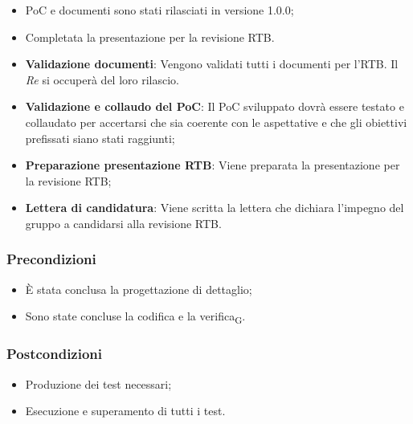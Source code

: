 \:
\begin{itemize}
	\item PoC e documenti sono stati rilasciati in versione 1.0.0;
	\item Completata la presentazione per la revisione RTB.
\end{itemize}

\:
\begin{itemize}
	\item \textbf{Validazione documenti}: Vengono validati tutti i documenti per l'RTB. Il \textit{Re} si occuperà del loro rilascio.
	\item \textbf{Validazione e collaudo del PoC}: Il PoC sviluppato dovrà essere testato e collaudato per accertarsi che sia coerente con le aspettative e che gli obiettivi prefissati siano stati raggiunti;
	\item \textbf{Preparazione presentazione RTB}: Viene preparata la presentazione per la revisione RTB;
	\item \textbf{Lettera di candidatura}: Viene scritta la lettera che dichiara l'impegno del gruppo a candidarsi alla revisione RTB.
\end{itemize}








\subsubsection{Precondizioni}\:
\begin{itemize}
    \item È stata conclusa la progettazione di dettaglio;
    \item Sono state concluse la codifica e la verifica\textsubscript{G}.
\end{itemize}

\subsubsection{Postcondizioni}\:
\begin{itemize}
    \item Produzione dei test necessari;
    \item Esecuzione e superamento di tutti i test.
\end{itemize}

